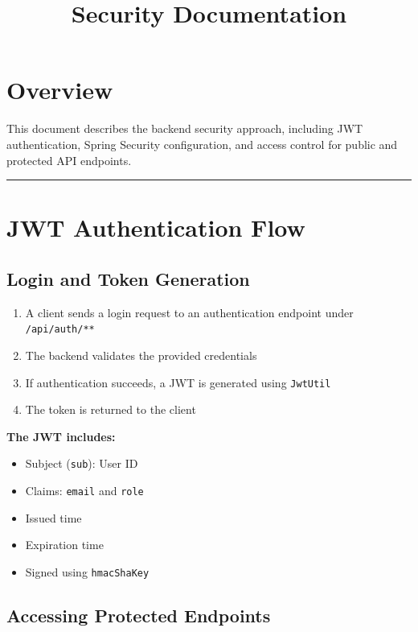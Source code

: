 \documentclass[a4paper,11pt]{article}
\title{Security Documentation}
\author{}
\date{}
\begin{document}
\maketitle

\section*{Overview}

This document describes the backend security approach, including JWT authentication, Spring Security configuration, and access control for public and protected API endpoints.

\hrule
\vspace{1em}

\section{JWT Authentication Flow}

\subsection{Login and Token Generation}

\begin{enumerate}
  \item A client sends a login request to an authentication endpoint under \texttt{/api/auth/**}
  \item The backend validates the provided credentials
  \item If authentication succeeds, a JWT is generated using \texttt{JwtUtil}
  \item The token is returned to the client
\end{enumerate}

\textbf{The JWT includes:}
\begin{itemize}
  \item Subject (\texttt{sub}): User ID
  \item Claims: \texttt{email} and \texttt{role}
  \item Issued time
  \item Expiration time
  \item Signed using \texttt{hmacShaKey}
\end{itemize}

\subsection{Accessing Protected Endpoints}
\end{document}
